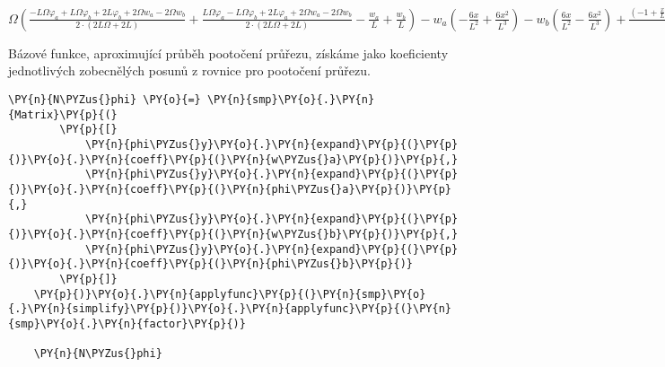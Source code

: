                 
    
    $\displaystyle \Omega \left(\frac{- L \Omega \varphi_{a} + L \Omega \varphi_{b} + 2 L \varphi_{b} + 2 \Omega w_{a} - 2 \Omega w_{b}}{2 \cdot \left(2 L \Omega + 2 L\right)} + \frac{L \Omega \varphi_{a} - L \Omega \varphi_{b} + 2 L \varphi_{a} + 2 \Omega w_{a} - 2 \Omega w_{b}}{2 \cdot \left(2 L \Omega + 2 L\right)} - \frac{w_{a}}{L} + \frac{w_{b}}{L}\right) - w_{a} \left(- \frac{6 x}{L^{2}} + \frac{6 x^{2}}{L^{3}}\right) - w_{b} \left(\frac{6 x}{L^{2}} - \frac{6 x^{2}}{L^{3}}\right) + \frac{\left(-1 + \frac{x}{L}\right)^{2} \left(L \Omega \varphi_{a} - L \Omega \varphi_{b} + 2 L \varphi_{a} + 2 \Omega w_{a} - 2 \Omega w_{b}\right)}{2 L \Omega + 2 L} + \frac{2 x \left(-1 + \frac{x}{L}\right) \left(L \Omega \varphi_{a} - L \Omega \varphi_{b} + 2 L \varphi_{a} + 2 \Omega w_{a} - 2 \Omega w_{b}\right)}{L \left(2 L \Omega + 2 L\right)} - \frac{2 x \left(1 - \frac{x}{L}\right) \left(- L \Omega \varphi_{a} + L \Omega \varphi_{b} + 2 L \varphi_{b} + 2 \Omega w_{a} - 2 \Omega w_{b}\right)}{L \left(2 L \Omega + 2 L\right)} + \frac{x^{2} \left(- L \Omega \varphi_{a} + L \Omega \varphi_{b} + 2 L \varphi_{b} + 2 \Omega w_{a} - 2 \Omega w_{b}\right)}{L^{2} \cdot \left(2 L \Omega + 2 L\right)}$
    
\vspace{0.3cm}
Bázové funkce, aproximující průběh pootočení průřezu, získáme jako koeficienty jednotlivých zobecnělých posunů z rovnice pro pootočení průřezu.
    
\begin{tcolorbox}[breakable, size=fbox, boxrule=1pt, pad at break*=1mm,colback=cellbackground, colframe=cellborder]
    \begin{Verbatim}[commandchars=\\\{\}]
    \PY{n}{N\PYZus{}phi} \PY{o}{=} \PY{n}{smp}\PY{o}{.}\PY{n}{Matrix}\PY{p}{(}
        \PY{p}{[}
            \PY{n}{phi\PYZus{}y}\PY{o}{.}\PY{n}{expand}\PY{p}{(}\PY{p}{)}\PY{o}{.}\PY{n}{coeff}\PY{p}{(}\PY{n}{w\PYZus{}a}\PY{p}{)}\PY{p}{,}
            \PY{n}{phi\PYZus{}y}\PY{o}{.}\PY{n}{expand}\PY{p}{(}\PY{p}{)}\PY{o}{.}\PY{n}{coeff}\PY{p}{(}\PY{n}{phi\PYZus{}a}\PY{p}{)}\PY{p}{,}
            \PY{n}{phi\PYZus{}y}\PY{o}{.}\PY{n}{expand}\PY{p}{(}\PY{p}{)}\PY{o}{.}\PY{n}{coeff}\PY{p}{(}\PY{n}{w\PYZus{}b}\PY{p}{)}\PY{p}{,}
            \PY{n}{phi\PYZus{}y}\PY{o}{.}\PY{n}{expand}\PY{p}{(}\PY{p}{)}\PY{o}{.}\PY{n}{coeff}\PY{p}{(}\PY{n}{phi\PYZus{}b}\PY{p}{)}
        \PY{p}{]}
    \PY{p}{)}\PY{o}{.}\PY{n}{applyfunc}\PY{p}{(}\PY{n}{smp}\PY{o}{.}\PY{n}{simplify}\PY{p}{)}\PY{o}{.}\PY{n}{applyfunc}\PY{p}{(}\PY{n}{smp}\PY{o}{.}\PY{n}{factor}\PY{p}{)}
    
    \PY{n}{N\PYZus{}phi}
    \end{Verbatim}
\end{tcolorbox}
     
